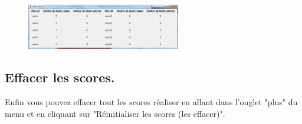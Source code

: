 \documentclass{article}
\begin{document}
\begin{figure}[!h]
\centerline{\includegraphics[width=0.6\textwidth]{images/Affichage_score.png}}
\vspace{0.5cm}
\caption{}
\end{figure}

\subsection{Effacer les scores.}
Enfin vous pouvez effacer tout les scores réaliser en allant dans l'onglet "plus" du menu et en cliquant sur "Réinitialiser les scores (les effacer)".
\end{document}
